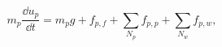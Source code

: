 \begin{equation}
m_p \frac {\dd u_p}{\dd t} = m_p g + f_{p,f} + \sum_{N_p}{f_{p,p}} +
\sum_{N_w}{f_{p,w}} ,
 \label{eq:eom4}
\end{equation}
